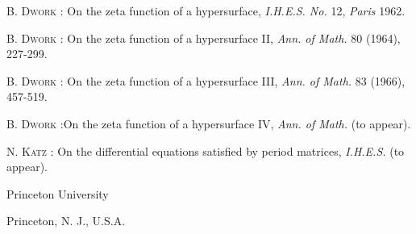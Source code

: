 \begin{thebibliography}{99}
 \textsc{B. Dwork :} On the zeta function of a hypersurface, {\em I.H.E.S. No.} 12, {\em Paris} 1962.

 \textsc{B. Dwork :} On the zeta function of a hypersurface II, {\em Ann. of Math.} 80 (1964), 227-299.

 \textsc{B. Dwork :} On the zeta function of a hypersurface III, {\em Ann. of Math.} 83 (1966), 457-519.

 \textsc{B. Dwork :}\pageoriginale On the zeta function of a hypersurface IV, {\em Ann. of Math.} (to appear).

 \textsc{N. Katz :} On the differential equations satisfied by period matrices, {\em I.H.E.S.} (to appear).
\end{thebibliography}

\medskip
\noindent
{\small Princeton University}

\noindent
{\small Princeton, N. J., U.S.A.}
